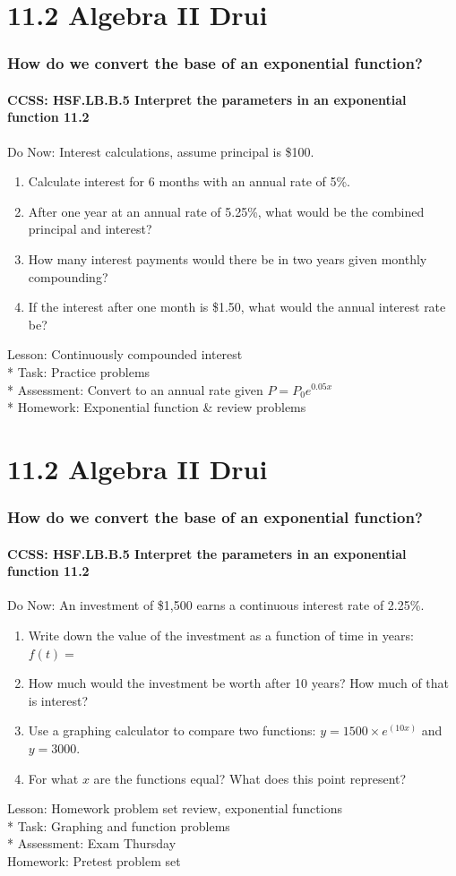 \documentclass{beamer}
\begin{document}
\section{11.2 Algebra II Drui}
\frame
{
  \frametitle{How do we convert the base of an exponential function?}
  \framesubtitle{CCSS: HSF.LB.B.5 Interpret the parameters in an exponential function \qquad \alert{11.2}}

  \begin{block}{Do Now: Interest calculations, assume principal is \$100.}
  \begin{enumerate}
      \item Calculate interest for 6 months with an annual rate of 5\%.
      \item After one year at an annual rate of 5.25\%, what would be the combined principal and interest?
      \item How many interest payments would there be in two years given monthly compounding?
      \item If the interest after one month is \$1.50, what would the annual interest rate be?
  \end{enumerate}
  \end{block}
  Lesson: Continuously compounded interest\\*
  Task: Practice problems\\*
  Assessment: Convert to an annual rate given $P=P_0e^{0.05x}$\\*
  Homework: Exponential function \& review problems\\
}


\section{11.2 Algebra II Drui}
\frame
{
  \frametitle{How do we convert the base of an exponential function?}
  \framesubtitle{CCSS: HSF.LB.B.5 Interpret the parameters in an exponential function \qquad \alert{11.2}}

  \begin{block}{Do Now: An investment of \$1,500 earns a continuous interest rate of 2.25\%. }
  \begin{enumerate}
      \item Write down the value of the investment as a function of time in years: $f(t)=$
      \item How much would the investment be worth after 10 years? How much of that is interest?
      \item Use a graphing calculator to compare two functions: $y=1500 \times e^{(10x)}$ and $y=3000$.
      \item For what $x$ are the functions equal? What does this point represent?
  \end{enumerate}
  \end{block}
  Lesson: Homework problem set review, exponential functions\\*
  Task: Graphing and function problems\\*
  Assessment: \alert{Exam Thursday}\\
  Homework: Pretest problem set\\
}
\end{document}
